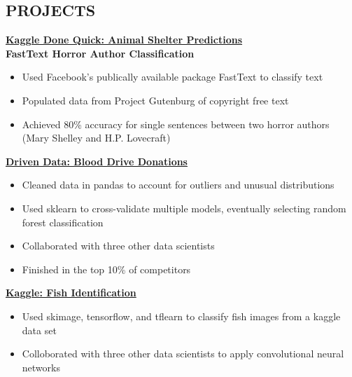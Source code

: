 \documentclass[line,margin,10pt]{res}
\begin{document}
\begin{resume}
\section{PROJECTS}
\textbf{\href{http://davisig.org/blog/2016/07/26/KDQ_AnimalShelter}{Kaggle Done Quick: Animal Shelter Predictions}}\\
\textbf{FastText Horror Author Classification}
\begin{itemize}\itemsep -2pt
\item Used Facebook's publically available package FastText to classify text 
\item Populated data from Project Gutenburg of copyright free text
\item Achieved 80\% accuracy for single sentences between two horror authors (Mary Shelley and H.P. Lovecraft)
\end{itemize}
\textbf{\href{https://github.com/davisincubator/digblood}{Driven Data: Blood Drive Donations}}
\begin{itemize}\itemsep -2pt
\item Cleaned data in pandas to account for outliers and unusual distributions
\item Used sklearn to cross-validate multiple models, eventually selecting random forest classification
\item Collaborated with three other data scientists
\item Finished in the top 10\% of competitors
\end{itemize}
\textbf{\href{https://github.com/davisincubator/sashimdig}{Kaggle: Fish Identification}}
\begin{itemize} \itemsep -2pt
\item Used skimage, tensorflow, and tflearn to classify fish images from a kaggle data set
\item Colloborated with three other data scientists to apply convolutional neural networks
\end{itemize}


\end{resume}
\end{document}
